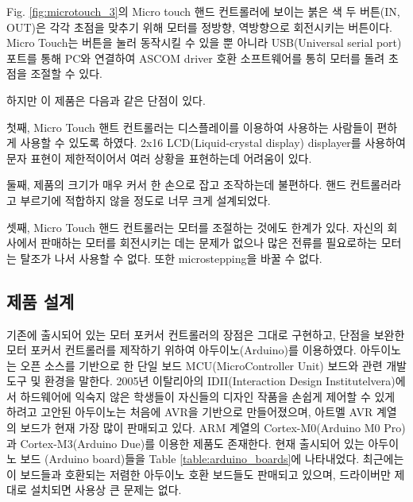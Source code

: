 Fig. \ref{fig:microtouch_3}의 Micro touch 핸드 컨트롤러에 보이는 붉은 색 두 버튼(IN, OUT)은 각각 초점을 맞추기 위해 모터를 정방향, 역방향으로 회전시키는 버튼이다. Micro Touch는 버튼을 눌러 동작시킬 수 있을 뿐 아니라 USB(Universal serial port) 포트를 통해 PC와 연결하여 ASCOM driver 호환 소프트웨어를 통히 모터를 돌려 초점을 조절할 수 있다. 

하지만 이 제품은 다음과 같은 단점이 있다. 

첫째, Micro Touch 핸트 컨트롤러는 디스플레이를 이용하여 사용하는 사람들이 편하게 사용할 수 있도록 하였다. 2x16 LCD(Liquid-crystal display) displayer를 사용하여 문자 표현이 제한적이어서 여러 상황을 표현하는데 어려움이 있다. 

둘째, 제품의 크기가 매우 커서 한 손으로 잡고 조작하는데 불편하다. 핸드 컨트롤러라고 부르기에 적합하지 않을 정도로 너무 크게 설계되었다. 

셋째, Micro Touch 핸드 컨트롤러는 모터를 조절하는 것에도 한계가 있다. 자신의 회사에서 판매하는 모터를 회전시키는 데는 문제가 없으나 많은 전류를 필요로하는 모터는 탈조가 나서 사용할 수 없다. 또한 microstepping을 바꿀 수 없다. 

\subsection{제품 설계}

기존에 출시되어 있는 모터 포커서 컨트롤러의 장점은 그대로 구현하고, 단점을 보완한 모터 포커서 컨트롤러를 제작하기 위하여 아두이노(Arduino)를 이용하였다. 아두이노는 오픈 소스를 기반으로 한 단일 보드 MCU(MicroController Unit) 보드와 관련 개발 도구 및 환경을 말한다. 2005년 이탈리아의 IDII(Interaction Design Institutelvera)에서 하드웨어에 익숙지 않은 학생들이 자신들의 디자인 작품을 손쉽게 제어할 수 있게 하려고 고안된 아두이노는 처음에 AVR을 기반으로 만들어졌으며, 아트멜 AVR 계열의 보드가 현재 가장 많이 판매되고 있다. ARM 계열의 Cortex-M0(Arduino M0 Pro)과 Cortex-M3(Arduino Due)를 이용한 제품도 존재한다. 현재 출시되어 있는 아두이노 보드 (Arduino board)들을 Table \ref{table:arduino_boards}에 나타내었다. 최근에는 이 보드들과 호환되는 저렴한 아두이노 호환 보드들도 판매되고 있으며, 드라이버만 제대로 설치되면 사용상 큰 문제는 없다. 

